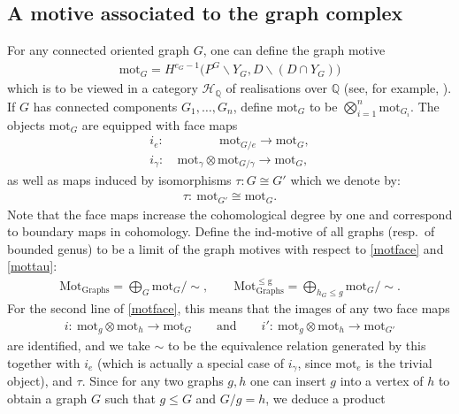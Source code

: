 \documentclass[pdftex]{sigma}%
\numberwithin{equation}{section}
\newcommand{\To}{\longrightarrow}
\newcommand{\Q}{\mathbb Q}
\newcommand{\0}{\color{blue}{\mathsf{0}}}
\begin{document}
\subsection{A motive associated to the graph complex}
For any connected oriented graph $G$, one can define the
graph motive \cite{BEK, Cosmic}
\begin{gather*}
\mathrm{mot}_G = H^{e_G-1} \big( P^G \backslash Y_G, D \backslash (D \cap Y_G)\big)
\end{gather*}
which is to be viewed in a category $\mathcal{H}_{\Q}$ of realisations over $\Q$ (see, for example, \cite{NotesMot, deligneP1}).
 If $G$ has connected components $G_1,\dots, G_n$, define $\mathrm{mot}_G$ to be $\bigotimes_{i=1}^n \mathrm{mot}_{G_i}$. The objects $\mathrm{mot}_G$ are equipped with face maps \cite{Cosmic}
\begin{align}
i_e\colon\ &\qquad\quad\ \, \mathrm{mot}_{G/e}\To \mathrm{mot}_G, \nonumber
\\
 i_{\gamma}\colon\ &\mathrm{mot}_{\gamma} \otimes \mathrm{mot}_{G/\gamma}\To \mathrm{mot}_G, \label{motface}
\end{align}
as well as maps induced by isomorphisms $\tau\colon G \cong G'$ which we denote by:
\begin{gather} \label{mottau}
\tau\colon\ \mathrm{mot}_{G'} \cong \mathrm{mot}_G.
\end{gather}
Note that the face maps increase the cohomological degree by one and correspond to boundary maps in cohomology.
Define the ind-motive of all graphs (resp.~of bounded genus) to be a limit of the graph motives with respect to \eqref{motface} and \eqref{mottau}:
\begin{gather} \label{TotalMotive}
\mathrm{Mot_{Graphs}} = \bigoplus_G \mathrm{mot}_G /{\sim}, \qquad
\mathrm{Mot^{\leq g}_{Graphs}} = \bigoplus_{h_G \leq g} \mathrm{mot}_G /{\sim}.
\end{gather}
For the second line of \eqref{motface}, this means that the images of any two face maps
\begin{gather*}
 i\colon\ \mathrm{mot}_{g} \otimes \mathrm{mot}_{h} \To \mathrm{mot}_G \qquad \text{and} \qquad
 i'\colon\ \mathrm{mot}_{g} \otimes \mathrm{mot}_{h} \To \mathrm{mot}_{G'}
 \end{gather*}
are identified, and we take $\sim$ to be the equivalence relation generated by this together with $i_e$ (which is actually a special case of $i_{\gamma}$, since $\mathrm{mot}_e$ is the trivial object), and $\tau$. Since for any two graphs $g,h$ one can insert $g$ into a vertex of $h$ to obtain a graph $G$ such that $g \leq G$ and $G/g= h$, we deduce a product
\end{document}
